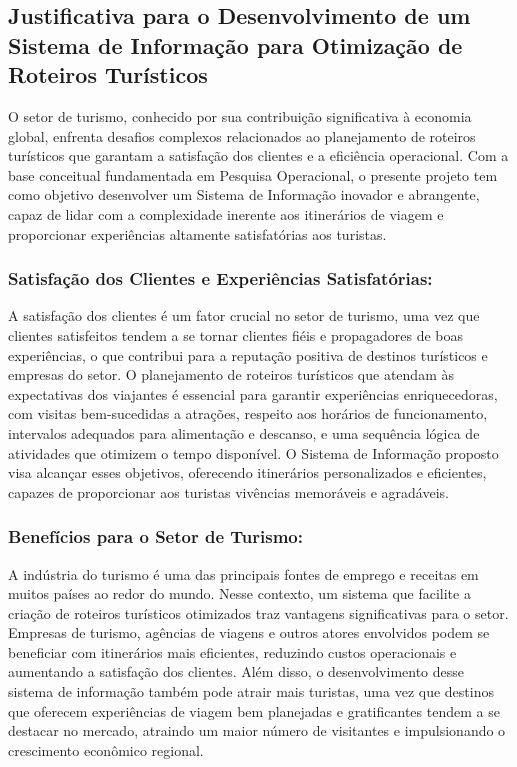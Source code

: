 \subsection{Justificativa para o Desenvolvimento de um Sistema de Informação para Otimização de Roteiros Turísticos}

O setor de turismo, conhecido por sua contribuição significativa à economia global, enfrenta desafios complexos relacionados ao planejamento de roteiros turísticos que garantam a satisfação dos clientes e a eficiência operacional. Com a base conceitual fundamentada em Pesquisa Operacional, o presente projeto tem como objetivo desenvolver um Sistema de Informação inovador e abrangente, capaz de lidar com a complexidade inerente aos itinerários de viagem e proporcionar experiências altamente satisfatórias aos turistas.

\subsubsection{Satisfação dos Clientes e Experiências Satisfatórias:}
A satisfação dos clientes é um fator crucial no setor de turismo, uma vez que clientes satisfeitos tendem a se tornar clientes fiéis e propagadores de boas experiências, o que contribui para a reputação positiva de destinos turísticos e empresas do setor. O planejamento de roteiros turísticos que atendam às expectativas dos viajantes é essencial para garantir experiências enriquecedoras, com visitas bem-sucedidas a atrações, respeito aos horários de funcionamento, intervalos adequados para alimentação e descanso, e uma sequência lógica de atividades que otimizem o tempo disponível. O Sistema de Informação proposto visa alcançar esses objetivos, oferecendo itinerários personalizados e eficientes, capazes de proporcionar aos turistas vivências memoráveis e agradáveis.

\subsubsection{Benefícios para o Setor de Turismo:}
A indústria do turismo é uma das principais fontes de emprego e receitas em muitos países ao redor do mundo. Nesse contexto, um sistema que facilite a criação de roteiros turísticos otimizados traz vantagens significativas para o setor. Empresas de turismo, agências de viagens e outros atores envolvidos podem se beneficiar com itinerários mais eficientes, reduzindo custos operacionais e aumentando a satisfação dos clientes. Além disso, o desenvolvimento desse sistema de informação também pode atrair mais turistas, uma vez que destinos que oferecem experiências de viagem bem planejadas e gratificantes tendem a se destacar no mercado, atraindo um maior número de visitantes e impulsionando o crescimento econômico regional.

